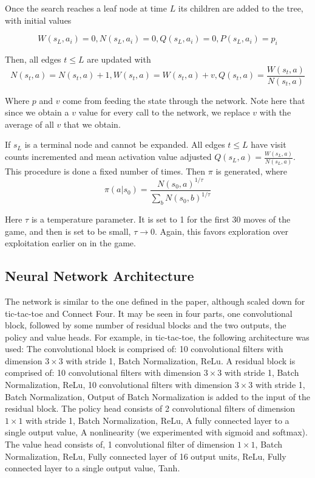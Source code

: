 \documentclass[english]{article}
\begin{document}
Once the search reaches a
leaf node at time $L$ its children are added to the tree, with initial values

$$W(s_L, a_i) = 0, N(s_L, a_i) = 0, Q(s_L, a_i) = 0, P(s_L, a_i) = p_i$$

Then, all edges $t \leq L$ are updated with
$$N(s_t,a)=N(s_t,a)+1,W(s_t,a)=W(s_t,a)+v, Q(s_t,a)=\frac{W(s_t,a)}{N(s_t,a)}$$

Where $p$ and $v$ come from feeding the state through the network. Note here
that since we obtain a $v$ value for every call to the network, we replace $v$
with the average of all $v$ that we obtain.

If $s_L$ is a terminal node and cannot be expanded. All edges $t\leq L$ have
visit counts incremented and mean activation value adjusted
$Q(s_L,a)=\frac{W(s_L,a)}{N(s_L,a)}$. This procedure is done a fixed number of
times. Then $\pi$ is generated, where
$$\pi(a|s_0) = \frac{N(s_0,a)^{1/\tau}}{\sum_b N(s_0,b)^{1/\tau}}$$

Here $\tau$ is a temperature parameter. It is set to 1 for the first 30 moves of
the game, and then is set to be small, $\tau \rightarrow 0$. Again, this favors
exploration over exploitation earlier on in the game.


\subsection{Neural Network Architecture}
The network is similar to the one defined in the paper, although scaled down for
tic-tac-toe and Connect Four. It may be seen in four parts, one convolutional
block, followed by some number of residual blocks \cite{Residual} and the two outputs,
the policy and value heads.
For example, in tic-tac-toe, the following architecture was used:
The convolutional block is comprised of: 10 convolutional filters with dimension
$3 \times 3$ with stride 1, Batch Normalization, ReLu.
A residual block is comprised of: 10 convolutional filters with dimension
$3 \times 3$ with stride 1, Batch Normalization, ReLu, 10 convolutional filters
with dimension $3 \times 3$ with stride 1, Batch Normalization, Output of Batch
Normalization is added to the input of the residual block.
The policy head consists of 2 convolutional filters of dimension $1 \times 1$
with stride 1, Batch Normalization, ReLu, A fully connected layer to a single
output value, A nonlinearity (we experimented with sigmoid and softmax).
The value head consists of, 1 convolutional filter of dimension $1 \times 1$,
Batch Normalization, ReLu, Fully connected layer of 16 output units, ReLu,
Fully connected layer to a single output value, Tanh.
\end{document}

